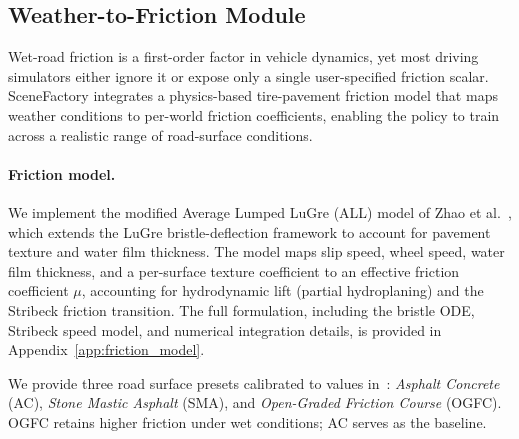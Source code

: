 
\subsection{Weather-to-Friction Module}
\label{sec:weather_friction}


Wet-road friction is a first-order factor in vehicle dynamics, yet most driving simulators either ignore it or expose only a single user-specified friction scalar.
SceneFactory integrates a physics-based tire-pavement friction model that maps weather conditions to per-world friction coefficients, enabling the policy to train across a realistic range of road-surface conditions.

\paragraph{Friction model.}
We implement the modified Average Lumped LuGre (ALL) model of Zhao et al.~\cite{zhao_tire-pavement_2024}, which extends the LuGre bristle-deflection framework to account for pavement texture and water film thickness.
The model maps slip speed, wheel speed, water film thickness, and a per-surface texture coefficient to an effective friction coefficient $\mu$, accounting for hydrodynamic lift (partial hydroplaning) and the Stribeck friction transition.
The full formulation, including the bristle ODE, Stribeck speed model, and numerical integration details, is provided in Appendix~\ref{app:friction_model}.

We provide three road surface presets calibrated to values in~\cite{zhao_tire-pavement_2024}:
\emph{Asphalt Concrete} (AC), \emph{Stone Mastic Asphalt} (SMA), and \emph{Open-Graded Friction Course} (OGFC).
OGFC retains higher friction under wet conditions; AC serves as the baseline.

